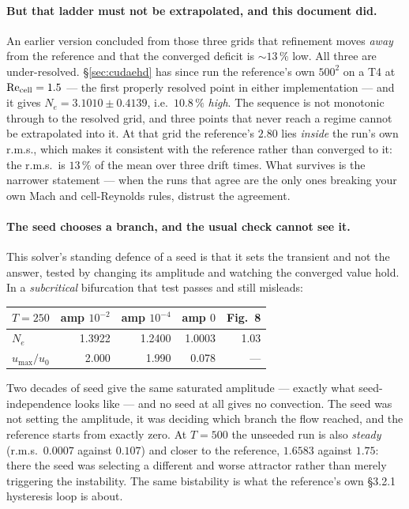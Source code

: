 \documentclass[11pt,a4paper]{article}
\begin{document}
\paragraph{But that ladder must not be extrapolated, and this document did.} An earlier
version concluded from those three grids that refinement moves \emph{away} from the
reference and that the converged deficit is $\sim\!13\,\%$ low. All three are
under-resolved. \S\ref{sec:cudaehd} has since run the reference's own $500^2$ on a T4 at
$\mathrm{Re}_{\rm cell}=1.5$ --- the first properly resolved point in either
implementation --- and it gives $N_e = 3.1010 \pm 0.4139$, i.e.\ $10.8\,\%$ \emph{high}.
The sequence is not monotonic through to the resolved grid, and three points that never
reach a regime cannot be extrapolated into it. At that grid the reference's $2.80$ lies
\emph{inside} the run's own r.m.s., which makes it consistent with the reference rather
than converged to it: the r.m.s.\ is $13\,\%$ of the mean over three drift times.
What survives is the narrower statement --- when the runs that agree are the only ones
breaking your own Mach and cell-Reynolds rules, distrust the agreement.

\paragraph{The seed chooses a branch, and the usual check cannot see it.} This solver's
standing defence of a seed is that it sets the transient and not the answer, tested by
changing its amplitude and watching the converged value hold. In a \emph{subcritical}
bifurcation that test passes and still misleads:

\begin{center}
\begin{tabular}{lrrrr}
\hline
$T=250$ & amp $10^{-2}$ & amp $10^{-4}$ & amp $0$ & Fig.~8 \\
\hline
$N_e$        & 1.3922 & 1.2400 & 1.0003 & 1.03 \\
$u_{\max}/u_0$ & 2.000 & 1.990  & 0.078  & --- \\
\hline
\end{tabular}
\end{center}

Two decades of seed give the same saturated amplitude --- exactly what seed-independence
looks like --- and no seed at all gives no convection. The seed was not setting the
amplitude, it was deciding which branch the flow reached, and the reference starts from
exactly zero. At $T=500$ the unseeded run is also \emph{steady} (r.m.s.\ $0.0007$ against
$0.107$) and closer to the reference, $1.6583$ against $1.75$: there the seed was
selecting a different and worse attractor rather than merely triggering the instability.
The same bistability is what the reference's own \S3.2.1 hysteresis loop is about.
\end{document}
